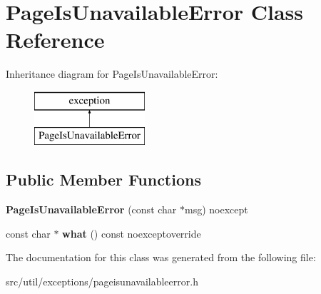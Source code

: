 \hypertarget{classPageIsUnavailableError}{}\section{Page\+Is\+Unavailable\+Error Class Reference}
\label{classPageIsUnavailableError}
Inheritance diagram for Page\+Is\+Unavailable\+Error\+:\begin{figure}[H]
\begin{center}
\leavevmode
\includegraphics[height=2.000000cm]{classPageIsUnavailableError}
\end{center}
\end{figure}
\subsection*{Public Member Functions}
\begin{DoxyCompactItemize}
\item 
{\bfseries Page\+Is\+Unavailable\+Error} (const char $\ast$msg) noexcept\hypertarget{classPageIsUnavailableError_ac04ee3fa602abb2a83bd3e8f4b12ced5}{}\label{classPageIsUnavailableError_ac04ee3fa602abb2a83bd3e8f4b12ced5}

\item 
const char $\ast$ {\bfseries what} () const noexceptoverride\hypertarget{classPageIsUnavailableError_a26f237d37d84d93adde9cc1fc42b4fb4}{}\label{classPageIsUnavailableError_a26f237d37d84d93adde9cc1fc42b4fb4}

\end{DoxyCompactItemize}


The documentation for this class was generated from the following file\+:\begin{DoxyCompactItemize}
\item 
src/util/exceptions/pageisunavailableerror.\+h\end{DoxyCompactItemize}
